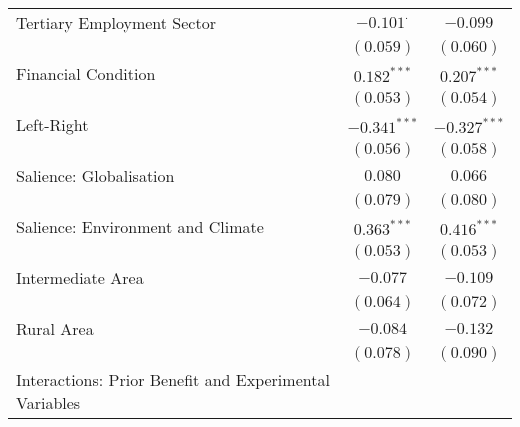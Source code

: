 \begin{center}
\begin{tiny}
\begin{longtable}{l@{} c@{} c@{}}
\quad Tertiary Employment Sector                                                                       & $-0.101^{\cdot}$ & $-0.099$         \\
                                                                                                       & $(0.059)$        & $(0.060)$        \\
\quad Financial Condition                                                                              & $0.182^{***}$    & $0.207^{***}$    \\
                                                                                                       & $(0.053)$        & $(0.054)$        \\
\quad Left-Right                                                                                       & $-0.341^{***}$   & $-0.327^{***}$   \\
                                                                                                       & $(0.056)$        & $(0.058)$        \\
\quad Salience: Globalisation                                                                          & $0.080$          & $0.066$          \\
                                                                                                       & $(0.079)$        & $(0.080)$        \\
\quad Salience: Environment and Climate                                                                & $0.363^{***}$    & $0.416^{***}$    \\
                                                                                                       & $(0.053)$        & $(0.053)$        \\
\quad Intermediate Area                                                                                & $-0.077$         & $-0.109$         \\
                                                                                                       & $(0.064)$        & $(0.072)$        \\
\quad Rural Area                                                                                       & $-0.084$         & $-0.132$         \\
                                                                                                       & $(0.078)$        & $(0.090)$        \\
Interactions: Prior Benefit and Experimental Variables                                                 &                  &                  \\

\end{longtable}
\end{tiny}
\end{center}
